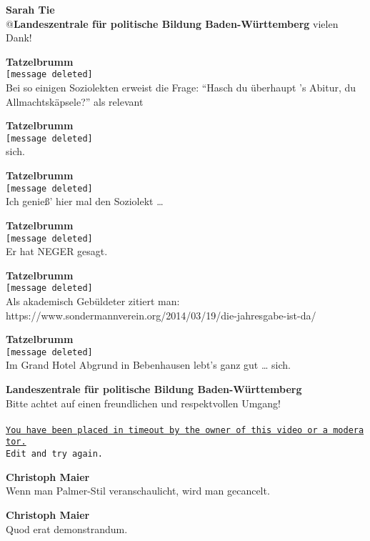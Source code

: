 \documentclass[a4,parindent=0pt]{article}
\let\oldparagraph\paragraph
\renewcommand{\paragraph}[1]{\oldparagraph{#1}\mbox{}}
\begin{document}
\textbf{Sarah Tie}\\
@\textbf{Landeszentrale für politische Bildung Baden-Württemberg} vielen
Dank!

\textbf{Tatzelbrumm}\\
\texttt{{[}message\ deleted{]}}\\
Bei so einigen Soziolekten\cite{soziolekt} erweist die
Frage: ``Hasch du überhaupt 's Abitur\cite{details}, du Allmachtskäpsele?''\cite{kaepsele} als relevant

\textbf{Tatzelbrumm}\\
\texttt{{[}message\ deleted{]}}\\
sich\cite{reflexivum}.

\textbf{Tatzelbrumm}\\
\texttt{{[}message\ deleted{]}}\\
Ich genieß' hier mal den Soziolekt\cite{soziolekt}
\ldots{}

\textbf{Tatzelbrumm}\\
\texttt{{[}message\ deleted{]}}\\
Er hat NEGER gesagt.\cite{neger}

\textbf{Tatzelbrumm}\\
\texttt{{[}message\ deleted{]}}\\
Als akademisch Gebüldeter zitiert man:\\
https://www.sondermannverein.org/2014/03/19/die-jahresgabe-ist-da/\cite{sondermann}

\textbf{Tatzelbrumm}\\
\texttt{{[}message\ deleted{]}}\\
Im Grand Hotel Abgrund\cite{grandhotelabgrund} in
Bebenhausen lebt's ganz gut \ldots{}
sich\cite{reflexivum}.

\textbf{Landeszentrale für politische Bildung Baden-Württemberg}\\
Bitte achtet auf einen freundlichen und respektvollen Umgang!
\paragraph{\label{timeout}}
\href{https://youtu.be/jSiCjzEgx1k?t=23}{\texttt{You\ have\ been\ placed\ in\ timeout\ by\ the\ owner\ of\ this\ video\ or\ a\ moderator.}}\\
\texttt{Edit\ and\ try\ again.}

\textbf{Christoph Maier}\\
Wenn man Palmer-Stil veranschaulicht, wird man gecancelt.

\textbf{Christoph Maier}\\
Quod erat demonstrandum.
\end{document}
